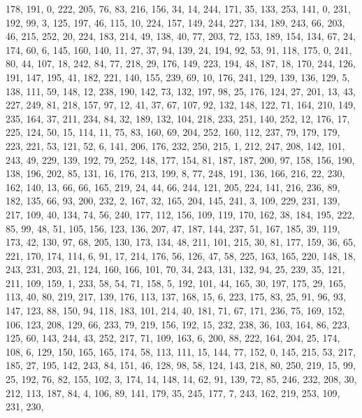 \begin{DoxyCode}
       178, 191, 0, 222, 205, 76, 83, 216, 156, 34, 14, 244, 171, 35, 133, 253, 141, 0, 231, 192, 99, 3, 125, 197,
       46, 115, 10, 224, 157, 149, 244, 227, 134, 189, 243, 66, 203, 46, 215, 252, 20, 224, 183, 214, 49, 138, 40,
       77, 203, 72, 153, 189, 154, 134, 67, 24, 174, 60, 6, 145, 160, 140, 11, 27, 37, 94, 139, 24, 194, 92, 53, 91,
       118, 175, 0, 241, 80, 44, 107, 18, 242, 84, 77, 218, 29, 176, 149, 223, 194, 48, 187, 18, 170, 244, 126,
       191, 147, 195, 41, 182, 221, 140, 155, 239, 69, 10, 176, 241, 129, 139, 136, 129, 5, 138, 111, 59, 148, 12,
       238, 190, 142, 73, 132, 197, 98, 25, 176, 124, 27, 201, 13, 43, 227, 249, 81, 218, 157, 97, 12, 41, 37, 67,
       107, 92, 132, 148, 122, 71, 164, 210, 149, 235, 164, 37, 211, 234, 84, 32, 189, 132, 104, 218, 233, 251, 140,
       252, 12, 176, 17, 225, 124, 50, 15, 114, 11, 75, 83, 160, 69, 204, 252, 160, 112, 237, 79, 179, 179, 223,
       221, 53, 121, 52, 6, 141, 206, 176, 232, 250, 215, 1, 212, 247, 208, 142, 101, 243, 49, 229, 139, 192, 79,
       252, 148, 177, 154, 81, 187, 187, 200, 97, 158, 156, 190, 138, 196, 202, 85, 131, 16, 176, 213, 199, 8, 77,
       248, 191, 136, 166, 216, 22, 230, 162, 140, 13, 66, 66, 165, 219, 24, 44, 66, 244, 121, 205, 224, 141, 216,
       236, 89, 182, 135, 66, 93, 200, 232, 2, 167, 32, 165, 204, 145, 241, 3, 109, 229, 231, 139, 217, 109, 40, 134,
       74, 56, 240, 177, 112, 156, 109, 119, 170, 162, 38, 184, 195, 222, 85, 99, 48, 51, 105, 156, 123, 136, 207,
       47, 187, 144, 237, 51, 167, 185, 39, 119, 173, 42, 130, 97, 68, 205, 130, 173, 134, 48, 211, 101, 215, 30,
       81, 177, 159, 36, 65, 221, 170, 174, 114, 6, 91, 17, 214, 176, 56, 126, 47, 58, 225, 163, 165, 220, 148, 18,
       243, 231, 203, 21, 124, 160, 166, 101, 70, 34, 243, 131, 132, 94, 25, 239, 35, 121, 211, 109, 159, 1, 233,
       58, 54, 71, 158, 5, 192, 101, 44, 165, 30, 197, 175, 29, 165, 113, 40, 80, 219, 217, 139, 176, 113, 137, 168,
       15, 6, 223, 175, 83, 25, 91, 96, 93, 147, 123, 88, 150, 94, 118, 183, 101, 214, 40, 181, 71, 67, 171, 236,
       75, 169, 152, 106, 123, 208, 129, 66, 233, 79, 219, 156, 192, 15, 232, 238, 36, 103, 164, 86, 223, 125, 60,
       143, 244, 43, 252, 217, 71, 109, 163, 6, 200, 88, 222, 164, 204, 25, 174, 108, 6, 129, 150, 165, 165, 174,
       58, 113, 111, 15, 144, 77, 152, 0, 145, 215, 53, 217, 185, 27, 195, 142, 243, 84, 151, 46, 128, 98, 58, 124,
       143, 218, 80, 250, 219, 15, 99, 25, 192, 76, 82, 155, 102, 3, 174, 14, 148, 14, 62, 91, 139, 72, 85, 246,
       232, 208, 30, 212, 113, 187, 84, 4, 106, 89, 141, 179, 35, 245, 177, 7, 243, 162, 219, 253, 109, 231, 230,

\end{DoxyCode}
